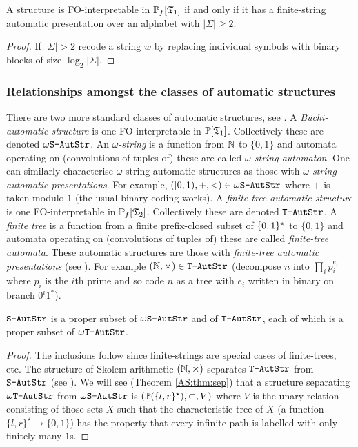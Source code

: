 \begin{proposition} \label{AS:prop:MTC}
A structure is FO-interpretable in ${\mathbb P}_f[\mathfrak{T}_1]$ if and only if it 
has a finite-string automatic presentation over an alphabet with $|\Sigma| \geq 2$.
\end{proposition}

\begin{proof}
If $|\Sigma| > 2$ recode a string $w$ by replacing individual symbols with binary blocks of size $\log_2 |\Sigma|$.
\end{proof}

\subsubsection*{Relationships amongst the classes of automatic structures}

There are two more standard classes of automatic structures, see \cite{Blum99}.
A {\em B\"uchi-automatic structure} is one FO-interpretable in ${\mathbb P}[\mathfrak{T}_1]$. Collectively these are denoted $\mbox{\tt $\omega$S-AutStr}$. An {\em $\omega$-string} is a function from $\mathbb{N}$ to $\{0,1\}$ and automata operating on (convolutions of tuples of) these are called {\em $\omega$-string automaton}. One can similarly characterise $\omega$-string automatic structures as those with {\em $\omega$-string automatic presentations}. For example, $([0,1),+,<) \in \mbox{\tt $\omega$S-AutStr}$ where $+$ is taken modulo $1$ (the usual binary coding works).
A {\em finite-tree automatic structure} is one FO-interpretable in ${\mathbb P}_f[\mathfrak{T}_2]$. Collectively these are denoted $\mbox{\tt T-AutStr}$. A {\em finite tree} is a function from a finite prefix-closed subset of $\{0,1\}^\star$ to $\{0,1\}$ and automata operating on (convolutions of tuples of) these are called {\em finite-tree automata}. These automatic structures are those with {\em finite-tree automatic presentations} (see \cite{Blum99,BeLiNe07}). For example  $(\mathbb{N},\times) \in \mbox{\tt T-AutStr}$ (decompose $n$ into
$\prod_{i} p_i^{e_i}$ where $p_i$ is the $i$th prime and so code $n$ as a tree with $e_i$ written in binary on
branch $0^i1^\ast$).  


\begin{proposition} \label{AS:prop:relations}
$\mbox{\tt S-AutStr}$ is a proper subset of $\mbox{\tt $\omega$S-AutStr}$ and of $\mbox{\tt T-AutStr}$, each of which is a proper subset of $\mbox{\tt $\omega$T-AutStr}$.
\end{proposition} 

\begin{proof} The inclusions follow since finite-strings are special cases of finite-trees, etc.
The structure of Skolem arithmetic $(\mathbb{N},\times)$ separates $\mbox{\tt T-AutStr}$ from $\mbox{\tt S-AutStr}$ (see \cite{Blum99}).
We will see (Theorem \ref{AS:thm:sep}) that a structure separating $\mbox{\tt $\omega$T-AutStr}$ from $\mbox{\tt $\omega$S-AutStr}$ is $({\mathbb P}(\{l,r\}^\star),\subset,V)$ where $V$ is the unary relation consisting of those sets $X$ such that the characteristic tree of $X$ (a function $\{l,r\}^\star \to \{0,1\}$) has the property that every infinite path is labelled with only finitely many $1$s.
\end{proof}


